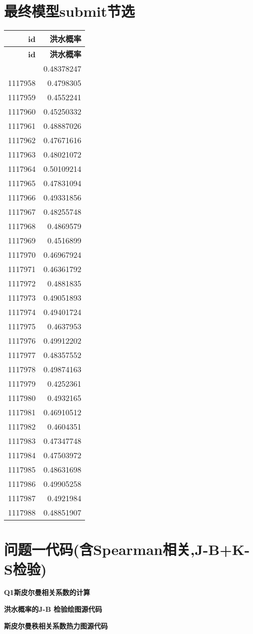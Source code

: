 \documentclass[withoutpreface,bwprint]{cumcmthesis} %
\begin{document}
\section{最终模型submit节选}
\begin{longtable}{|r|r|} \hline \textbf{id} & \textbf{洪水概率} \\ \hline \endfirsthead \hline \textbf{id} & \textbf{洪水概率} \\ \hline \endhead \hline \endfoot \hline \endlastfoot 1117957 & 0.48378247 \\ 1117958 & 0.4798305 \\ 1117959 & 0.4552241 \\ 1117960 & 0.45250332 \\ 1117961 & 0.48887026 \\ 1117962 & 0.47671616 \\ 1117963 & 0.48021072 \\ 1117964 & 0.50109214 \\ 1117965 & 0.47831094 \\ 1117966 & 0.49331856 \\ 1117967 & 0.48255748 \\ 1117968 & 0.4869579 \\ 1117969 & 0.4516899 \\ 1117970 & 0.46967924 \\ 1117971 & 0.46361792 \\ 1117972 & 0.4881835 \\ 1117973 & 0.49051893 \\ 1117974 & 0.49401724 \\ 1117975 & 0.4637953 \\ 1117976 & 0.49912202 \\ 1117977 & 0.48357552 \\ 1117978 & 0.49874163 \\ 1117979 & 0.4252361 \\ 1117980 & 0.4932165 \\ 1117981 & 0.46910512 \\ 1117982 & 0.4604351 \\ 1117983 & 0.47347748 \\ 1117984 & 0.47503972 \\ 1117985 & 0.48631698 \\ 1117986 & 0.49905258 \\ 1117987 & 0.4921984 \\ 1117988 & 0.48851907 \\ 
\end{longtable}
\section{问题一代码(含Spearman相关,J-B+K-S检验)}
\textbf{\textcolor[rgb]{0.98,0.00,0.00}{Q1斯皮尔曼相关系数的计算}}

\textbf{\textcolor[rgb]{0.98,0.00,0.00}{洪水概率的J-B 检验绘图源代码}}

\textbf{\textcolor[rgb]{0.98,0.00,0.00}{斯皮尔曼秩相关系数热力图源代码}}

\end{document}
